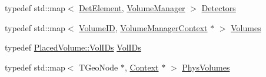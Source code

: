 \begin{DoxyCompactItemize}
typedef std\+::map$<$ \hyperlink{class_d_d4hep_1_1_geometry_1_1_det_element}{Det\+Element}, \hyperlink{class_d_d4hep_1_1_geometry_1_1_volume_manager}{Volume\+Manager} $>$ \hyperlink{class_d_d4hep_1_1_geometry_1_1_volume_manager_a89d31fb00522aa56dfa2708fedaf1e4f}{Detectors}
\item 
typedef std\+::map$<$ \hyperlink{class_d_d4hep_1_1_geometry_1_1_volume_manager_ab1f746b561c93be38bc7c6e66fc8ca8a}{Volume\+ID}, \hyperlink{class_d_d4hep_1_1_geometry_1_1_volume_manager_context}{Volume\+Manager\+Context} $\ast$ $>$ \hyperlink{class_d_d4hep_1_1_geometry_1_1_volume_manager_a81625fd63b37636f0b4019b102aba787}{Volumes}
\item 
typedef \hyperlink{class_d_d4hep_1_1_geometry_1_1_placed_volume_a4383991fbc94adc2997ef98c9d30d9a6}{Placed\+Volume\+::\+Vol\+I\+Ds} \hyperlink{class_d_d4hep_1_1_geometry_1_1_volume_manager_a38763d6e830cf8e61ddd89d5416656eb}{Vol\+I\+Ds}
\item 
typedef std\+::map$<$ T\+Geo\+Node $\ast$, \hyperlink{class_d_d4hep_1_1_geometry_1_1_volume_manager_adadb14f2ccbeaad001b7bc6ddb6dc715}{Context} $\ast$ $>$ \hyperlink{class_d_d4hep_1_1_geometry_1_1_volume_manager_a6dd3900be98a6b11d4c8ab7f59632f36}{Phys\+Volumes}
\end{DoxyCompactItemize}

